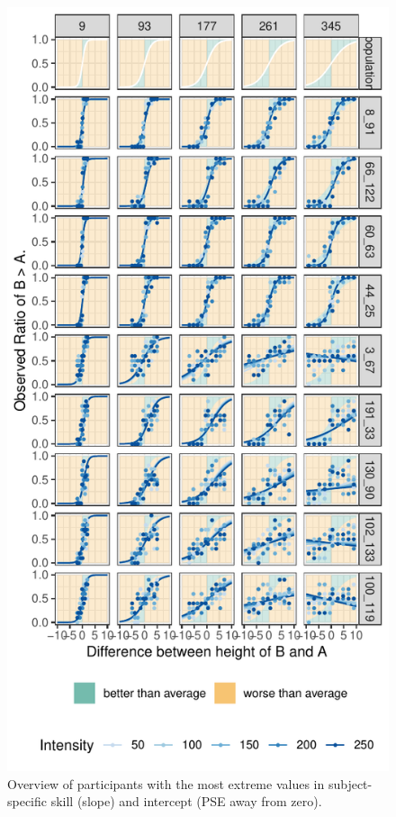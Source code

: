 \begin{knitrout}
\color{fgcolor}\begin{figure}
\includegraphics[width=\linewidth]{figure/individuals-1} \caption[Overview of  participants with the most extreme values in subject-specific skill (slope) and intercept (PSE away from zero)]{Overview of  participants with the most extreme values in subject-specific skill (slope) and intercept (PSE away from zero).}\label{fig:individuals}
\end{figure}

\end{knitrout}


